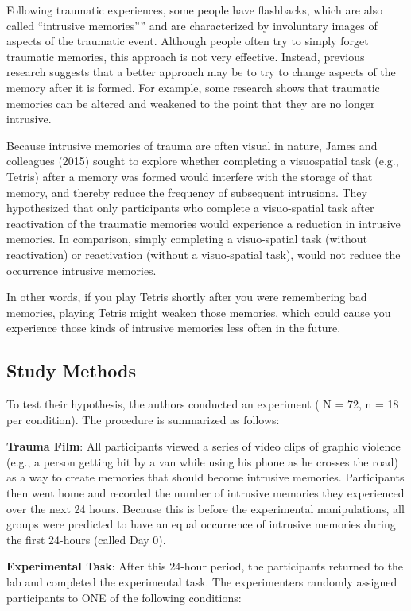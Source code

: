 \documentclass[
]{book}
\begin{document}
Following traumatic experiences, some people have flashbacks, which are also called ``intrusive memories'''' and are characterized by involuntary images of aspects of the traumatic event. Although people often try to simply forget traumatic memories, this approach is not very effective. Instead, previous research suggests that a better approach may be to try to change aspects of the memory after it is formed. For example, some research shows that traumatic memories can be altered and weakened to the point that they are no longer intrusive.

Because intrusive memories of trauma are often visual in nature, James and colleagues (2015) sought to explore whether completing a visuospatial task (e.g., Tetris) after a memory was formed would interfere with the storage of that memory, and thereby reduce the frequency of subsequent intrusions. They hypothesized that only participants who complete a visuo-spatial task after reactivation of the traumatic memories would experience a reduction in intrusive memories. In comparison, simply completing a visuo-spatial task (without reactivation) or reactivation (without a visuo-spatial task), would not reduce the occurrence intrusive memories.

In other words, if you play Tetris shortly after you were remembering bad memories, playing Tetris might weaken those memories, which could cause you experience those kinds of intrusive memories less often in the future.

\hypertarget{study-methods}{%
\subsection{Study Methods}\label{study-methods}}

To test their hypothesis, the authors conducted an experiment ( N = 72, n = 18 per condition). The procedure is summarized as follows:

\textbf{Trauma Film}: All participants viewed a series of video clips of graphic violence (e.g., a person getting hit by a van while using his phone as he crosses the road) as a way to create memories that should become intrusive memories. Participants then went home and recorded the number of intrusive memories they experienced over the next 24 hours. Because this is before the experimental manipulations, all groups were predicted to have an equal occurrence of intrusive memories during the first 24-hours (called Day 0).

\textbf{Experimental Task}: After this 24-hour period, the participants returned to the lab and completed the experimental task. The experimenters randomly assigned participants to ONE of the following conditions:
\end{document}
